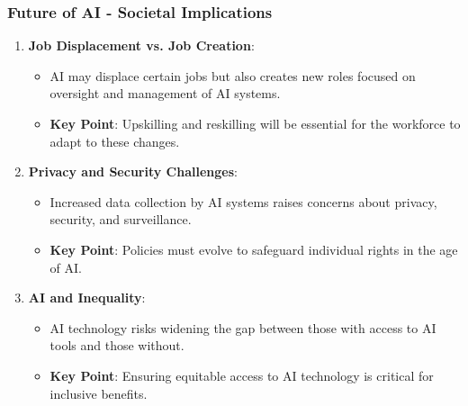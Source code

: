 \documentclass[aspectratio=169]{beamer}
\begin{document}
\begin{frame}[fragile]
    \frametitle{Future of AI - Societal Implications}
    \begin{enumerate}
        \item \textbf{Job Displacement vs. Job Creation}:
            \begin{itemize}
                \item AI may displace certain jobs but also creates new roles focused on oversight and management of AI systems.
                \item \textbf{Key Point}: Upskilling and reskilling will be essential for the workforce to adapt to these changes.
            \end{itemize}
            
        \item \textbf{Privacy and Security Challenges}:
            \begin{itemize}
                \item Increased data collection by AI systems raises concerns about privacy, security, and surveillance.
                \item \textbf{Key Point}: Policies must evolve to safeguard individual rights in the age of AI.
            \end{itemize}
            
        \item \textbf{AI and Inequality}:
            \begin{itemize}
                \item AI technology risks widening the gap between those with access to AI tools and those without.
                \item \textbf{Key Point}: Ensuring equitable access to AI technology is critical for inclusive benefits.
            \end{itemize}
    \end{enumerate}
\end{frame}
\end{document}
